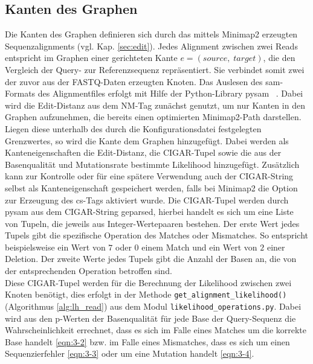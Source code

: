 \subsection{Kanten des Graphen} \label{subsec:edges}
Die Kanten des Graphen definieren sich durch das mittels Minimap2 erzeugten Sequenzalignments (vgl. Kap. \ref{sec:edit}). Jedes Alignment zwischen zwei Reads entspricht im Graphen einer gerichteten Kante $e = (source,\; target)$, die den Vergleich der Query- zur Referenzsequenz repräsentiert. Sie verbindet somit zwei der zuvor aus der FASTQ-Daten erzeugten Knoten. Das Auslesen des sam-Formats des Alignmentfiles erfolgt mit Hilfe der Python-Library pysam ~\cite{pysam}. Dabei wird die Edit-Distanz aus dem NM-Tag zunächst genutzt, um nur Kanten in den Graphen aufzunehmen, die bereits einen optimierten Minimap2-Path darstellen. Liegen diese unterhalb des durch die Konfigurationsdatei festgelegten Grenzwertes, so wird die Kante dem Graphen hinzugefügt. Dabei werden als Kanteneigenschaften die Edit-Distanz, die CIGAR-Tupel sowie die aus der Basenqualität und Mutationsrate bestimmte Likelihood hinzugefügt. Zusätzlich kann zur Kontrolle oder für eine spätere Verwendung auch der CIGAR-String selbst als Kanteneigenschaft gespeichert werden, falls bei Minimap2 die Option zur Erzeugung des cs-Tags aktiviert wurde. Die CIGAR-Tupel werden durch pysam aus dem CIGAR-String geparsed, hierbei handelt es sich um eine Liste von Tupeln, die jeweils aus Integer-Wertepaaren bestehen. Der erste Wert jedes Tupels gibt die spezifische Operation des Matches oder Mismatches. So entspricht beispielsweise ein Wert von $ 7 $ oder $ 0 $ einem Match und ein Wert von $ 2 $ einer Deletion. Der zweite Werte jedes Tupels gibt die Anzahl der Basen an, die von der entsprechenden Operation betroffen sind. \\

Diese CIGAR-Tupel werden für die Berechnung der Likelihood zwischen zwei Knoten benötigt, dies erfolgt in der Methode \lstinline|get_alignment_likelihood()| (Algorithmus \ref{alg:lh_read}) aus dem Modul \lstinline|likelihood_operations.py|. Dabei wird aus den p-Werten der Basenqualität für jede Base der Query-Sequenz die Wahrscheinlichkeit errechnet, dass es sich im Falle eines Matches um die korrekte Base handelt  \eqref{eqn:3-2} bzw. im Falle eines Mismatches, dass es sich um einen Sequenzierfehler \eqref{eqn:3-3} oder um eine Mutation handelt \eqref{eqn:3-4}. \\

